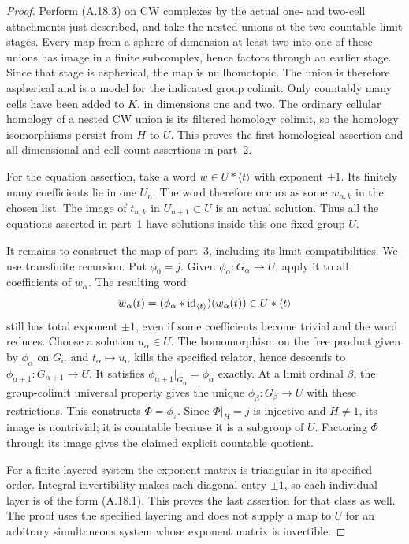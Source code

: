 \begin{proof}
Perform (A.18.3) on CW complexes by the actual one- and two-cell
attachments just described, and take the nested unions at the
two countable limit stages. Every map from a sphere of dimension at least
two into one of
these unions has image in a finite subcomplex, hence factors
through an earlier stage. Since that stage is aspherical, the
map is nullhomotopic. The union is therefore aspherical and
is a model for the indicated group colimit. Only countably
many cells have been added to $K$, in dimensions one and two.
The ordinary cellular homology of a nested CW union is its
filtered homology colimit, so the homology isomorphisms persist
from $H$ to $U$. This proves the first homological assertion and
all dimensional and cell-count assertions in part~2.

For the equation assertion, take a word $w\in U*\langle t\rangle$
with exponent $\pm1$. Its finitely many coefficients lie in one
$U_n$. The word therefore occurs as some $w_{n,k}$ in the chosen
list. The image of $t_{n,k}$ in $U_{n+1}\subset U$ is an actual
solution. Thus all the equations asserted in part~1 have solutions
inside this one fixed group $U$.

It remains to construct the map of part~3, including its limit
compatibilities. We use transfinite recursion. Put $\phi_0=j$.
Given $\phi_\alpha:G_\alpha\to U$, apply it to all coefficients
of $w_\alpha$. The resulting word
\[
 \overline w_\alpha(t)
       =(\phi_\alpha*{\rm id}_{\langle t\rangle})(w_\alpha(t))
       \in U*\langle t\rangle
\]
still has total exponent $\pm1$, even if some coefficients become
trivial and the word reduces. Choose a solution $u_\alpha\in U$.
The homomorphism on the free product given by $\phi_\alpha$ on
$G_\alpha$ and $t_\alpha\mapsto u_\alpha$ kills the specified
relator, hence descends to
$\phi_{\alpha+1}:G_{\alpha+1}\to U$. It satisfies
$\phi_{\alpha+1}|_{G_\alpha}=\phi_\alpha$ exactly. At a limit ordinal
$\beta$, the group-colimit universal property gives the unique
$\phi_\beta:G_\beta\to U$ with these restrictions.
This constructs $\Phi=\phi_\tau$. Since $\Phi|_H=j$ is injective
and $H\ne1$, its image is nontrivial; it is countable because it
is a subgroup of $U$. Factoring $\Phi$ through its image gives
the claimed explicit countable quotient.

For a finite layered system the exponent matrix is triangular
in its specified order. Integral invertibility makes each
diagonal entry $\pm1$, so each individual layer is of the form
(A.18.1). This proves the last assertion for that class as well.
The proof uses the specified layering and does not supply a
map to $U$ for an arbitrary simultaneous system whose exponent
matrix is invertible.
\end{proof}

